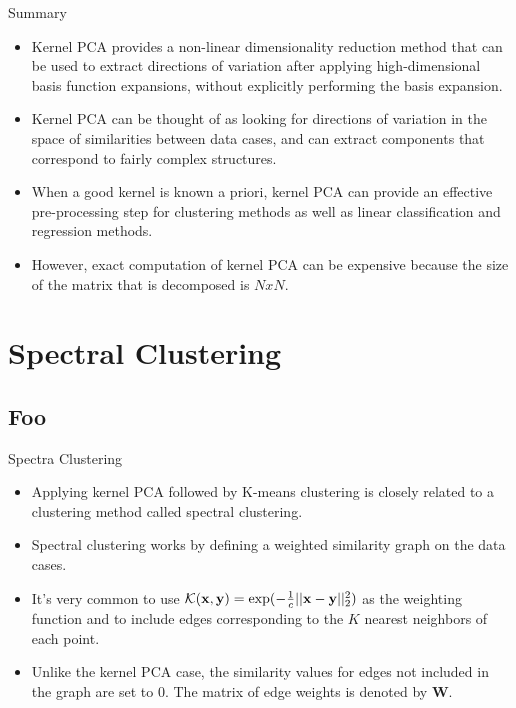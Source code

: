 \documentclass[serif,xcolor=pdftex,dvipsnames,table,hyperref={bookmarks=false,breaklinks}]{beamer}
\begin{document}
\begin{frame}[t]{Summary}

\begin{itemize}
\item Kernel PCA provides a non-linear dimensionality reduction method that can 
be used to extract directions of variation after applying high-dimensional 
basis function expansions, without explicitly performing the basis expansion.

\pause\item Kernel PCA can be thought of as looking for directions of variation 
in the space of similarities between data cases, and can extract components 
that correspond to fairly complex structures.

\pause\item When a good kernel is known a priori, kernel PCA can provide an
effective pre-processing step for clustering methods as well as linear 
classification and regression methods.  

\pause\item However, exact computation of kernel PCA can be expensive because 
the size of the matrix that is decomposed is $NxN$.
\end{itemize} 

\end{frame}

\section{Spectral Clustering}
\subsection{Foo}

\begin{frame}[t]{Spectra Clustering}

\begin{itemize}
\item Applying kernel PCA followed by K-means clustering is closely related to 
a clustering method called spectral clustering.

\pause\item Spectral clustering works by defining a weighted 
similarity graph on the data cases. 

\pause\item It's very common to use $\mathcal{K}({\mathbf{x}},{\mathbf{y}}) = 
\exp(-\frac{1}{c}||{\mathbf{x}}-{\mathbf{y}}||_2^2)$ as the weighting function and to 
include edges corresponding to the $K$ nearest neighbors of each point.

\pause\item Unlike the kernel PCA case, the similarity values for
edges not included in the graph are set to $0$. The matrix of edge weights is 
denoted by $\mathbf{W}$.

\end{itemize} 

\end{frame}
\end{document}
